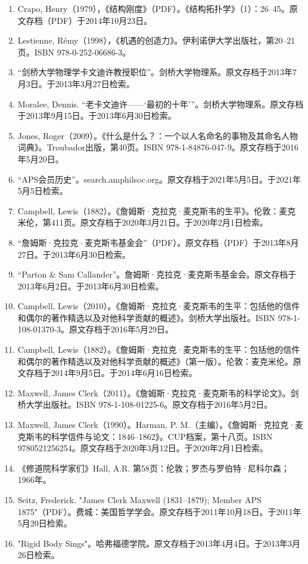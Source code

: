 \begin{enumerate}
\item Crapo, Henry（1979），《结构刚度》（PDF）。《结构拓扑学》（1）：26–45。原文存档（PDF）于2014年10月23日。  
\item Lestienne, Rémy（1998），《机遇的创造力》。伊利诺伊大学出版社，第20–21页。ISBN 978-0-252-06686-3。  
\item “剑桥大学物理学卡文迪许教授职位”。剑桥大学物理系。原文存档于2013年7月3日。于2013年3月27日检索。
\item Moralee, Dennis. “老卡文迪许——‘最初的十年’”。剑桥大学物理系。原文存档于2013年9月15日。于2013年6月30日检索。  
\item Jones, Roger（2009）。《什么是什么？：一个以人名命名的事物及其命名人物词典》。Troubador出版，第40页。ISBN 978-1-84876-047-9。原文存档于2016年5月20日。  
\item “APS会员历史”。search.amphilsoc.org。原文存档于2021年5月5日。于2021年5月5日检索。  
\item Campbell, Lewis（1882）。《詹姆斯·克拉克·麦克斯韦的生平》。伦敦：麦克米伦，第411页。原文存档于2020年3月21日。于2020年2月1日检索。  
\item “詹姆斯·克拉克·麦克斯韦基金会”（PDF）。原文存档（PDF）于2013年8月27日。于2013年6月30日检索。  
\item “Parton & Sam Callander”。詹姆斯·克拉克·麦克斯韦基金会。原文存档于2013年6月2日。于2013年6月30日检索。
\item Campbell, Lewis（2010）。《詹姆斯·克拉克·麦克斯韦的生平：包括他的信件和偶尔的著作精选以及对他科学贡献的概述》。剑桥大学出版社。ISBN 978-1-108-01370-3。原文存档于2016年5月29日。  
\item Campbell, Lewis（1882）。《詹姆斯·克拉克·麦克斯韦的生平：包括他的信件和偶尔的著作精选以及对他科学贡献的概述》（第一版）。伦敦：麦克米伦。原文存档于2014年9月5日。于2014年6月16日检索。  
\item Maxwell, James Clerk（2011）。《詹姆斯·克拉克·麦克斯韦的科学论文》。剑桥大学出版社。ISBN 978-1-108-01225-6。原文存档于2016年5月2日。  
\item Maxwell, James Clerk（1990）。Harman, P. M.（主编）。《詹姆斯·克拉克·麦克斯韦的科学信件与论文：1846–1862》。CUP档案，第十八页。ISBN 9780521256254。原文存档于2020年3月12日。于2020年2月1日检索。  
\item 《修道院科学家们》Hall, A.R. 第58页：伦敦；罗杰与罗伯特·尼科尔森；1966年。
\item Seitz, Frederick. "James Clerk Maxwell (1831–1879); Member APS 1875"（PDF）。费城：美国哲学学会。原文存档于2011年10月18日。于2011年5月20日检索。  
\item "Rigid Body Sings"。哈弗福德学院。原文存档于2013年4月4日。于2013年3月26日检索。  

\end{enumerate}
